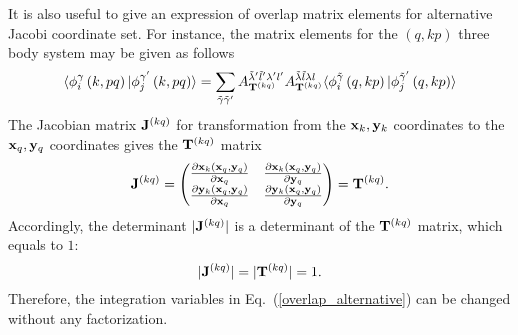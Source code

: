 \documentclass[
12pt, %
oneside, %
english, %
onehalfspacing, %
onehalfspacing, %
headsepline, %
]{MastersDoctoralThesis} %
\begin{document}
It is also useful to give an expression of overlap matrix elements for alternative Jacobi coordinate set. For instance, the matrix elements for the $(q,kp)$ three body system may be given as follows
\begin{equation}
\langle \phi_{i}^{\gamma}\left(k,pq \right) \vert 
\phi_{j}^{\gamma^{\prime}}\left(k,pq \right) \rangle
=
\sum_{\tilde{\gamma} \tilde{\gamma}'}
A^{\tilde{\lambda}' \tilde{l}' \lambda' l'}_{{\bf T}^{(kq)} }
A^{\tilde{\lambda} \tilde{l} \lambda l}_{{\bf T}^{(kq)} }
\langle \phi_{i}^{\tilde{\gamma}}\left(q,kp \right) \vert 
\phi_{j}^{\tilde{\gamma}^{\prime}}\left(q,kp \right) \rangle
\label{overlap_alternative}
\end{equation}
The Jacobian  matrix ${\bf J}^{(kq)}$ for transformation from the ${\bf x}_k, {\bf y}_k$ coordinates to the ${\bf x}_q, {\bf y}_q$ coordinates gives the ${\bf T}^{(kq)}$ matrix
\begin{equation}
{\bf J}^{(kq)} = 
\begin{pmatrix}
\frac{\partial {\bf x}_k \left({\bf x}_q,{\bf y}_q \right)}{ \partial {\bf x}_q }  
& \frac{\partial {\bf x}_k \left({\bf x}_q,{\bf y}_q \right)}{ \partial {\bf y}_q } \\
\frac{\partial {\bf y}_k \left({\bf x}_q,{\bf y}_q \right)}{ \partial {\bf x}_q }  
& \frac{\partial {\bf y}_k \left({\bf x}_q,{\bf y}_q \right)}{ \partial {\bf y}_q } 
\end{pmatrix} = {\bf T}^{(kq)}.
\end{equation}
Accordingly, the determinant $\vert {\bf J}^{(kq)} \vert$ is a determinant of the ${\bf T}^{(kq)}$ matrix, which equals to $1$:
\begin{equation}
\vert {\bf J}^{(kq)} \vert = \vert {\bf T}^{(kq)} \vert =1.
\end{equation}
  Therefore, the integration variables in Eq.~(\ref{overlap_alternative}) can be changed without any factorization. 
\end{document}
